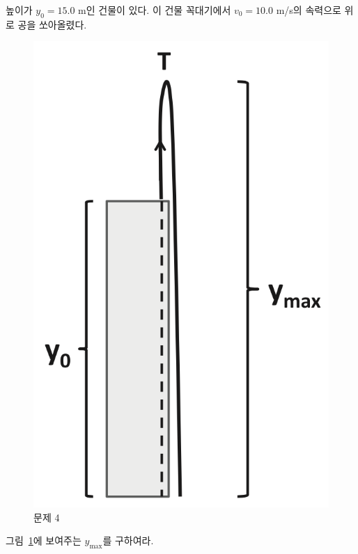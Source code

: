 \documentclass[floatfix,nofootinbib,superscriptaddress,fleqn,preprint]{revtex4}
\begin{document}
 높이가 $y_0=15.0$ m인 건물이 있다. 이 건물
꼭대기에서 $v_0=10.0$ m/s의 속력으로 위로 공을 쏘아올렸다. 
\begin{figure}[ht]
  \centering
\includegraphics[scale=0.5]{Qfig4-4-20210312.png}  
  \caption{문제 4}
  \label{fig:4}
\end{figure}
그림~\ref{fig:4}에 보여주는 $y_{\mathrm{max}}$를 구하여라. 
\end{document}
